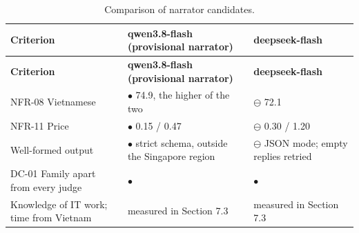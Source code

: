 {\small{}\renewcommand{\arraystretch}{1.1}
\begin{longtable}{|>{\raggedright\arraybackslash}p{}|>{\raggedright\arraybackslash}p{}|>{\raggedright\arraybackslash}p{}|}
\caption{Comparison of narrator candidates.} \\
\hline
\textbf{Criterion} & \textbf{qwen3.\allowbreak{}8-\allowbreak{}flash (provisional narrator)} & \textbf{deepseek-\allowbreak{}flash} \\ \hline
\endfirsthead
\hline
\textbf{Criterion} & \textbf{qwen3.\allowbreak{}8-\allowbreak{}flash (provisional narrator)} & \textbf{deepseek-\allowbreak{}flash} \\ \hline
\endhead
NFR-08 Vietnamese & $\bullet$ 74.9, the higher of the two & $\ominus$ 72.1 \\ \hline
NFR-11 Price & $\bullet$ 0.15 / 0.47 & $\ominus$ 0.30 / 1.20 \\ \hline
Well-formed output & $\bullet$ strict schema, outside the Singapore region & $\ominus$ JSON mode; empty replies retried \\ \hline
DC-01 Family apart from every judge & $\bullet$ & $\bullet$ \\ \hline
Knowledge of IT work; time from Vietnam & measured in Section 7.3 & measured in Section 7.3 \\ \hline
\end{longtable}
}

